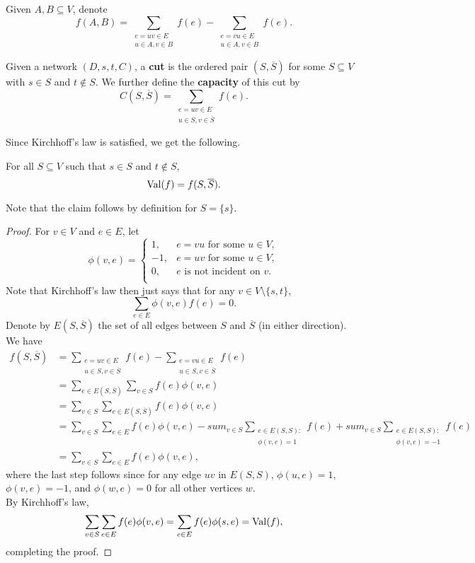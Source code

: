 			Given $A,B\subseteq V$, denote
			\[ f(A,B) = \sum_{\substack{e = uv \in E \\ u \in A, v \in B }} f(e) - \sum_{\substack{e = vu \in E \\ u \in A, v \in B }} f(e). \]

			\begin{fdef}[Cut]
				Given a network $(D,s,t,C)$, a \textbf{cut} is the ordered pair $(S,\overline{S})$ for some $S \subseteq V$ with $s\in S$ and $t\not\in S$. We further define the \textbf{capacity} of this cut by
				\[ C(S,\overline{S}) = \sum_{\substack{e = uv \in E \\ u \in S, v \in \overline{S}}} f(e). \]
			\end{fdef}

			Since Kirchhoff's law is satisfied, we get the following.

			\begin{ftheo}
				For all $S \subseteq V$ such that $s \in S$ and $t\not\in S$,
				\[ \operatorname{Val}(f) = f(S,\overline{S}). \]
			\end{ftheo}
			Note that the claim follows by definition for $S = \{s\}$.
			\begin{proof}
				For $v\in V$ and $e\in E$, let
				\[
					\phi(v,e) =
					\begin{cases}
						1, & e = vu \text{ for some $u\in V$}, \\
						-1, & e = uv \text{ for some $u\in V$}, \\
						0, & e\text{ is not incident on }v. \\
					\end{cases}
				\]
				Note that Kirchhoff's law then just says that for any $v\in V\setminus\{s,t\}$,
				\[ \sum_{e\in E} \phi(v,e) f(e) = 0. \]
				Denote by $E(S,\overline{S})$ the set of all edges between $S$ and $\overline{S}$ (in either direction).\\
				We have
				\begin{align*}
					f(S,\overline{S}) &= \sum_{\substack{e = uv \in E \\ u \in S, v \in \overline{S}}} f(e) - \sum_{\substack{e = vu \in E \\ u \in S, v \in \overline{S}}} f(e) \\
						&= \sum_{e \in E(S,\overline{S})} \sum_{v \in S} f(e) \phi(v,e) \\
						&= \sum_{v\in S} \sum_{e \in E(S,\overline{S})} f(e) \phi(v,e) \\
						&= \sum_{v\in S} \sum_{e \in E} f(e) \phi(v,e) - sum_{v \in S} \sum_{\substack{e \in E(S,S): \\ \phi(v,e) = 1}} f(e) + sum_{v \in S} \sum_{\substack{e \in E(S,S): \\ \phi(v,e) = -1}} f(e) \\
						&= \sum_{v\in S} \sum_{e\in E} f(e) \phi(v,e),
				\end{align*}
				where the last step follows since for any edge $uv$ in $E(S,S)$, $\phi(u,e) = 1$, $\phi(v,e) = -1$, and $\phi(w,e) = 0$ for all other vertices $w$.\\
				By Kirchhoff's law,
				\[ \sum_{v\in S} \sum_{e \in E} f(e) \phi(v,e) = \sum_{e \in E} f(e) \phi(s,e) = \operatorname{Val}(f), \]
				completing the proof.
			\end{proof}

